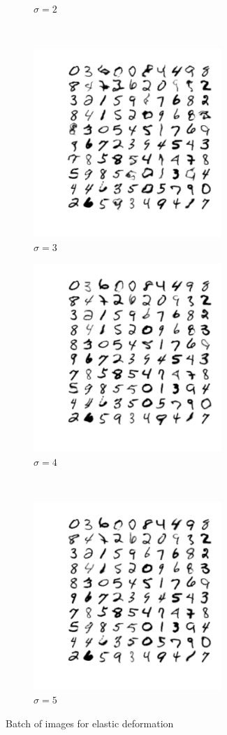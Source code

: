 \documentclass[11pt]{article}
\begin{document}
\begin{figure}[htp]
\begin{subfigure}[t]{0.45\textwidth}
        \caption{$\sigma = 2$}
    \end{subfigure}
    ~ 
    \begin{subfigure}[t]{0.45\textwidth}
        \centering
        \includegraphics[height=2.8in]{ela_sig_3}
        \caption{$\sigma = 3$}
    \end{subfigure}
        \begin{subfigure}[t]{0.45\textwidth}
        \centering
        \includegraphics[height=2.8in]{ela_sig_4}
        \caption{$\sigma = 4$}
    \end{subfigure}
    ~ 
    \begin{subfigure}[t]{0.45\textwidth}
        \centering
        \includegraphics[height=2.8in]{ela_sig_5}
        \caption{$\sigma = 5$}
    \end{subfigure}
    \caption{Batch of images for elastic deformation}
    \label{fg:ela_batch}
\end{figure}
\end{document}
